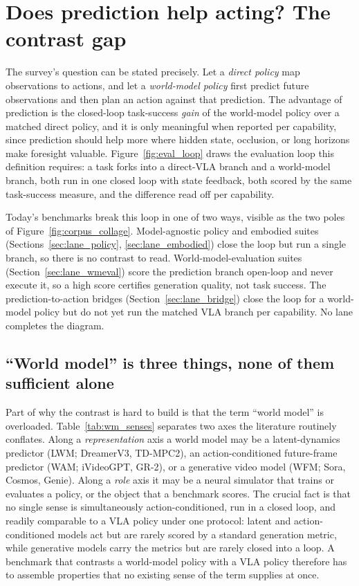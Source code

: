 \section{Does prediction help acting? The contrast gap}
\label{sec:gap}

The survey's question can be stated precisely. Let a \emph{direct policy} map observations to actions,
and let a \emph{world-model policy} first predict future observations and then plan an action against
that prediction. The advantage of prediction is the closed-loop task-success \emph{gain} of the
world-model policy over a matched direct policy, and it is only meaningful when reported per
capability, since prediction should help more where hidden state, occlusion, or long horizons make
foresight valuable. Figure~\ref{fig:eval_loop} draws the evaluation loop this definition requires: a
task forks into a direct-VLA branch and a world-model branch, both run in one closed loop with state
feedback, both scored by the same task-success measure, and the difference read off per capability.



Today's benchmarks break this loop in one of two ways, visible as the two poles of
Figure~\ref{fig:corpus_collage}. Model-agnostic policy and embodied suites (Sections~\ref{sec:lane_policy},
\ref{sec:lane_embodied}) close the loop but run a single branch, so there is no contrast to read.
World-model-evaluation suites (Section~\ref{sec:lane_wmeval}) score the prediction branch open-loop
and never execute it, so a high score certifies generation quality, not task success. The
prediction-to-action bridges (Section~\ref{sec:lane_bridge}) close the loop for a world-model policy
but do not yet run the matched VLA branch per capability. No lane completes the diagram.

\subsection{``World model'' is three things, none of them sufficient alone}

Part of why the contrast is hard to build is that the term ``world model'' is overloaded.
Table~\ref{tab:wm_senses} separates two axes the literature routinely conflates. Along a
\emph{representation} axis a world model may be a latent-dynamics predictor (LWM; DreamerV3, TD-MPC2),
an action-conditioned future-frame predictor (WAM; iVideoGPT, GR-2), or a generative video model
(WFM; Sora, Cosmos, Genie). Along a \emph{role} axis it may be a neural simulator that trains or
evaluates a policy, or the object that a benchmark scores. The crucial fact is that no single sense
is simultaneously action-conditioned, run in a closed loop, and readily comparable to a VLA policy
under one protocol: latent and action-conditioned models act but are rarely scored by a standard
generation metric, while generative models carry the metrics but are rarely closed into a loop. A
benchmark that contrasts a world-model policy with a VLA policy therefore has to assemble properties
that no existing sense of the term supplies at once.

